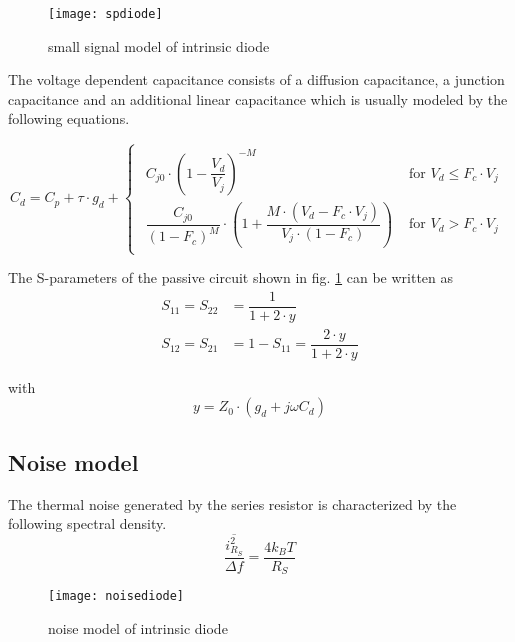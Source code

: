 \begin{figure}[ht]
\begin{center}
\texttt{[image: spdiode]}
\end{center}
\caption{small signal model of intrinsic diode}
\label{fig:spdiode}
\end{figure}
\FloatBarrier

The voltage dependent capacitance consists of a diffusion capacitance,
a junction capacitance and an additional linear capacitance which is
usually modeled by the following equations.

\begin{equation}
C_{d} = C_p + \tau \cdot g_{d} +
\begin{cases}
\begin{array}{ll}
C_{j0}\cdot \left(1 - \dfrac{V_{d}}{V_{j}}\right)^{-M} & \textrm{ for } V_{d} \le F_c\cdot V_j\\
\dfrac{C_{j0}}{\left(1 - F_c\right)^M}\cdot \left(1 + \dfrac{M\cdot \left(V_{d} - F_c\cdot V_j\right)}{V_{j}\cdot\left(1 - F_c\right)}\right) & \textrm{ for } V_{d} > F_c\cdot V_j
\end{array}
\end{cases}
\end{equation}

The S-parameters of the passive circuit shown in
fig. \ref{fig:spdiode} can be written as
\begin{align}
S_{11} = S_{22} &= \dfrac{1}{1 + 2\cdot y}\\
S_{12} = S_{21} &= 1 - S_{11} = \dfrac{2\cdot y}{1 + 2\cdot y}
\end{align}

with
\begin{equation}
y = Z_{0}\cdot \left(g_{d} + j\omega C_{d}\right)
\end{equation}

\subsection{Noise model}

The thermal noise generated by the series resistor is characterized by
the following spectral density.
\begin{equation}
\dfrac{\overline{i_{R_S}^2}}{\Delta f} = \dfrac{4 k_B T}{R_S}
\end{equation}

\begin{figure}[ht]
\begin{center}
\texttt{[image: noisediode]}
\end{center}
\caption{noise model of intrinsic diode}
\label{fig:noisediode}
\end{figure}
\FloatBarrier

